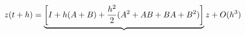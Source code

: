 \documentclass[preview]{standalone}
\begin{document}
\begin{align*}
\special{dvisvgm:raw <g id='unique000'>}z(t+h) = \underbrace{\left[I + h(A+B) + \frac{h^2}{2}(A^2 + AB + BA + B^2) \right]}z + O(h^3)\special{dvisvgm:raw </g>}
\end{align*}
\end{document}
